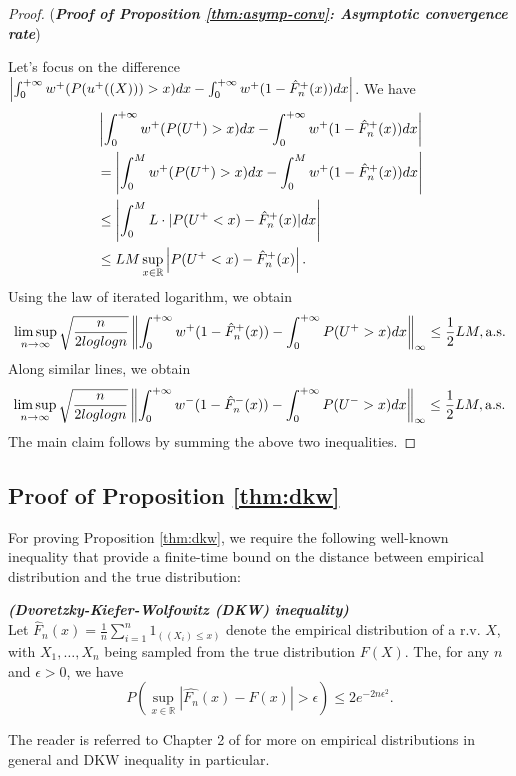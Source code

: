 \begin{proof}(\textbf{\textit{Proof of Proposition \ref{thm:asymp-conv}: Asymptotic convergence rate}})

Let's focus on the difference 
$
\left|
\int_0^{+\infty} w^{+}(P(u^+((X)))>x) dx- \int_0^{+\infty} w^+(1-{\hat F_n}^+(x)) dx
\right|
$. We have
\begin{align*}
&
\left|
\int_0^{+\infty} w^{+}(P(U^+)>x) dx- \int_0^{+\infty} w^+(1-{\hat F_n}^+(x)) dx
\right|
\\
&
=
\left|
\int_0^M w^{+}(P(U^+)>x) dx- \int_0^M w^+(1-{\hat F_n}^+(x)) dx
\right|
\\
&
\leq
\left|
\int_0^M L\cdot |P(U^+<x)-{\hat F_n}^+(x)| dx
\right|
\\
&
\leq
LM
\sup_{x\in \mathbb{R}}
\left|
P(U^+<x)-{\hat F_n}^+(x)
\right|.
\end{align*}
Using the law of iterated logarithm, we obtain 
$$
\limsup_{n\rightarrow \infty} \sqrt{\frac{n}{2log log n}} \left\|\int_0^{+\infty} w^+(1-{\hat F_n}^+(x))- \int_0^{+\infty} P(U^+>x)dx\right\|_{\infty} 
\leq \frac{1}{2} LM, \text{a.s.}
$$
Along similar lines, we obtain 
$$
\limsup_{n\rightarrow \infty} \sqrt{\frac{n}{2log log n}} \left\|\int_0^{+\infty} w^{-}(1-{\hat F_n}^-(x))- \int_0^{+\infty} P(U^->x)dx\right\|_{\infty} 
\leq \frac{1}{2} LM, \text{a.s.}
$$
The main claim follows by summing the above two inequalities. 
\end{proof}

\subsection*{Proof of Proposition \ref{thm:dkw}}
For proving Proposition \ref{thm:dkw}, we require the following well-known inequality that provide a finite-time bound on the distance between empirical distribution and the true distribution:
\begin{lemma}{\textbf{\textit{(Dvoretzky-Kiefer-Wolfowitz (DKW) inequality)}}}\\
Let ${\hat F_n}(x)=\frac{1}{n} \sum_{i=1}^n 1_{((X_i) \leq x)}$ denote the empirical distribution of a r.v. $X$, with $X_1,\ldots,X_n$ being sampled from the true distribution $F(X)$.
The, for any $n$ and $\epsilon>0$, we have
$$
P(\sup_{x\in \mathbb{R}}|\hat{F_n}(x)-F(x)|>\epsilon ) \leq 2 e^{-2n\epsilon^2}.
$$
\end{lemma}

The reader is referred to Chapter 2 of \cite{wasserman2006} for more on empirical distributions in general and DKW inequality in particular.

